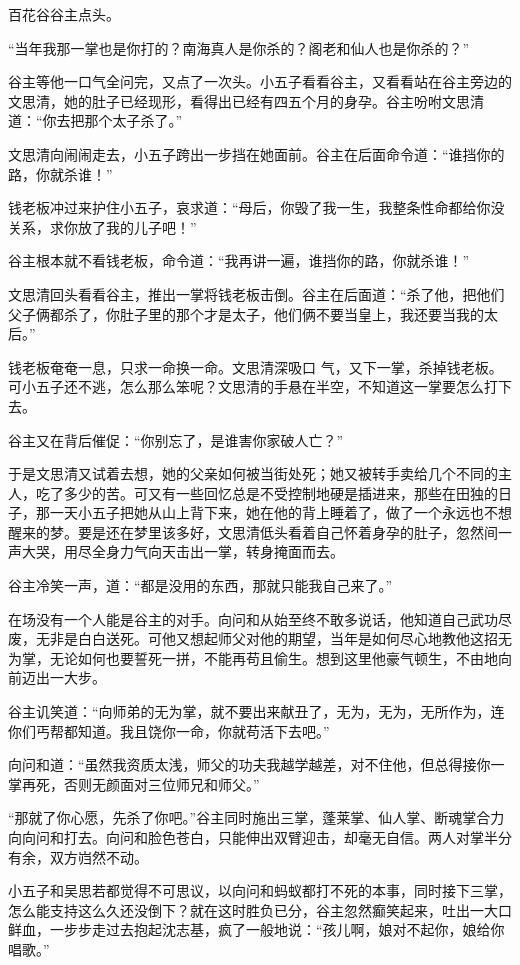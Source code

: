 百花谷谷主点头。

“当年我那一掌也是你打的？南海真人是你杀的？阁老和仙人也是你杀的？”

谷主等他一口气全问完，又点了一次头。小五子看看谷主，又看看站在谷主旁边的文思清，她的肚子已经现形，看得出已经有四五个月的身孕。谷主吩咐文思清道：“你去把那个太子杀了。”

文思清向闹闹走去，小五子跨出一步挡在她面前。谷主在后面命令道：“谁挡你的路，你就杀谁！”

钱老板冲过来护住小五子，哀求道：“母后，你毁了我一生，我整条性命都给你没关系，求你放了我的儿子吧！”

谷主根本就不看钱老板，命令道：“我再讲一遍，谁挡你的路，你就杀谁！”

文思清回头看看谷主，推出一掌将钱老板击倒。谷主在后面道：“杀了他，把他们父子俩都杀了，你肚子里的那个才是太子，他们俩不要当皇上，我还要当我的太后。”

钱老板奄奄一息，只求一命换一命。文思清深吸口
气，又下一掌，杀掉钱老板。可小五子还不逃，怎么那么笨呢？文思清的手悬在半空，不知道这一掌要怎么打下去。

谷主又在背后催促：“你别忘了，是谁害你家破人亡？”

于是文思清又试着去想，她的父亲如何被当街处死；她又被转手卖给几个不同的主人，吃了多少的苦。可又有一些回忆总是不受控制地硬是插进来，那些在田独的日子，那一天小五子把她从山上背下来，她在他的背上睡着了，做了一个永远也不想醒来的梦。要是还在梦里该多好，文思清低头看着自己怀着身孕的肚子，忽然间一声大哭，用尽全身力气向天击出一掌，转身掩面而去。

谷主冷笑一声，道：“都是没用的东西，那就只能我自己来了。”

在场没有一个人能是谷主的对手。向问和从始至终不敢多说话，他知道自己武功尽废，无非是白白送死。可他又想起师父对他的期望，当年是如何尽心地教他这招无为掌，无论如何也要誓死一拼，不能再苟且偷生。想到这里他豪气顿生，不由地向前迈出一大步。

谷主讥笑道：“向师弟的无为掌，就不要出来献丑了，无为，无为，无所作为，连你们丐帮都知道。我且饶你一命，你就苟活下去吧。”

向问和道：“虽然我资质太浅，师父的功夫我越学越差，对不住他，但总得接你一掌再死，否则无颜面对三位师兄和师父。”

“那就了你心愿，先杀了你吧。”谷主同时施出三掌，蓬莱掌、仙人掌、断魂掌合力向向问和打去。向问和脸色苍白，只能伸出双臂迎击，却毫无自信。两人对掌半分有余，双方岿然不动。

小五子和吴思若都觉得不可思议，以向问和蚂蚁都打不死的本事，同时接下三掌，怎么能支持这么久还没倒下？就在这时胜负已分，谷主忽然癫笑起来，吐出一大口鲜血，一步步走过去抱起沈志基，疯了一般地说：“孩儿啊，娘对不起你，娘给你唱歌。”


